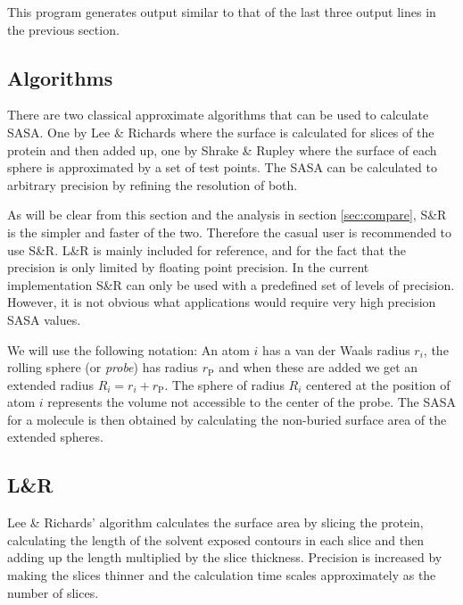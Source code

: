 \documentclass[a4paper,11pt]{article}
\begin{document}
This program generates output similar to that of the last three output
lines in the previous section.

\appendix

\begin{small}

\section{Algorithms}\label{sec:alg}

There are two classical approximate algorithms that can be used to
calculate SASA. One by Lee \& Richards \cite{LnR} where the surface is
calculated for slices of the protein and then added up, one by Shrake
\& Rupley \cite{SnR} where the surface of each sphere is approximated
by a set of test points. The SASA can be calculated to arbitrary
precision by refining the resolution of both. 

As will be clear from this section and the analysis in section
\ref{sec:compare}, S\&R is the simpler and faster of the
two. Therefore the casual user is recommended to use S\&R. L\&R is
mainly included for reference, and for the fact that the precision is
only limited by floating point precision. In the current
implementation S\&R can only be used with a predefined set of levels
of precision. However, it is not obvious what applications would
require very high precision SASA values.

We will use the following notation: An atom $i$ has a van der Waals
radius $r_i$, the rolling sphere (or \emph{probe}) has radius
$r_\text{P}$ and when these are added we get an extended radius $R_i =
r_i + r_\text{P}$. The sphere of radius $R_i$ centered at the position
of atom $i$ represents the volume not accessible to the center of the
probe. The SASA for a molecule is then obtained by calculating the
non-buried surface area of the extended spheres.

\subsection{L\&R} \label{sec:alg_LnR}

Lee \& Richards' algorithm calculates the surface area by slicing the
protein, calculating the length of the solvent exposed contours in
each slice and then adding up the length multiplied by the slice
thickness. Precision is increased by making the slices thinner and the
calculation time scales approximately as the number of slices.


\end{small}
\end{document}
